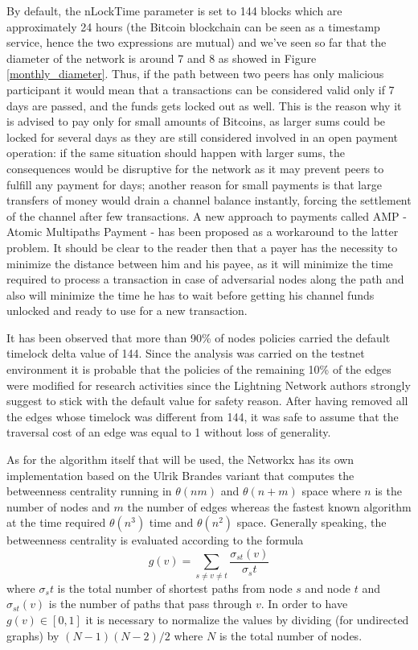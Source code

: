 	By default, the nLockTime parameter is set to 144 blocks which are approximately 24 hours (the Bitcoin blockchain can be seen as a timestamp service, hence the two expressions are mutual) and we've seen so far that the diameter of the network is around 7 and 8 as showed in Figure \ref{monthly_diameter}. Thus, if the path between two peers has only malicious participant it would mean that a transactions can be considered valid only if 7 days are passed, and the funds gets locked out as well. This is the reason why it is advised to pay only for small amounts of Bitcoins, as larger sums could be locked for several days as they are still considered involved in an open payment operation: if the same situation should happen with larger sums, the consequences would be disruptive for the network as it may prevent peers to fulfill any payment for days; another reason for small payments is that large transfers of money would drain a channel balance instantly, forcing the settlement of the channel after few transactions. A new approach to payments called AMP \cite{Amp2018} - Atomic Multipaths Payment - has been proposed as a workaround to the latter problem. It should be clear to the reader then that a payer has the necessity to minimize the distance between him and his payee, as it will minimize the time required to process a transaction in case of adversarial nodes along the path and also will minimize the time he has to wait before getting his channel funds unlocked and ready to use for a new transaction.
	
	It has been observed that more than 90\% of nodes policies carried the default timelock delta value of 144. Since the analysis was carried on the testnet environment it is probable that the policies of the remaining 10\% of the edges were modified for research activities since the Lightning Network authors strongly suggest to stick with the default value for safety reason. After having removed all the edges whose timelock was different from 144, it was safe to assume that the traversal cost of an edge was equal to 1 without loss of generality.
	
	As for the algorithm itself that will be used, the Networkx has its own implementation based on the Ulrik Brandes \cite{Brandes2001} variant that computes the betweenness centrality running in $\theta(nm)$ and $\theta(n + m)$ space where $n$ is the number of nodes and $m$ the number of edges whereas the fastest known algorithm at the time required $\theta(n^3)$ time and $\theta(n^2)$ space.	Generally speaking, the betweenness centrality is evaluated according to the formula 
	\begin{equation}
		g(v) = \sum_{s \neq v \neq t}{\frac{\sigma_{st}(v) }{\sigma_st}}
	\end{equation}
	where $\sigma_st$ is the total number of shortest paths from node $s$ and node $t$ and $\sigma_{st}(v)$ is the number of paths that pass through $v$. In order to have $g(v) \in [0, 1]$ it is necessary to normalize the values by dividing (for undirected graphs) by $(N-1)(N-2)/2$ where $N$ is the total number of nodes.
	
